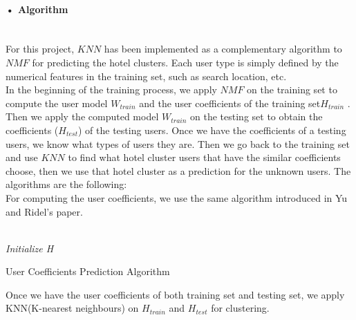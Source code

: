 \documentclass[11pt]{article} %
\begin{document}
\paragraph{• Algorithm}\mbox{}\\
For this project, $KNN$ has been implemented as a complementary algorithm to $NMF$ for predicting the hotel clusters. Each user type is simply defined by the numerical features in the training set, such as search location, etc.\\
In the beginning of the training process, we apply $NMF$ on the training set to compute the user model $W_{train}$ and the user coefficients of the training set$H_{train}$ . Then we apply the computed model $W_{train}$ on the testing set to obtain the coefficients ($H_{test}$) of the testing users. Once we have the coefficients of a testing users, we know what types of users they are. Then we go back to the training set and use $KNN$ to find what hotel cluster users that have the similar coefficients choose, then we use that hotel cluster as a prediction for the unknown users. The algorithms are the following:\\
For computing the user coefficients, we use the same algorithm \cite[p.6]{nmf1} introduced in Yu and Ridel's paper. \\\\
\begin{algorithm}[H]
\BlankLine
\emph{Initialize H}\;
\caption{User Coefficients Prediction Algorithm}\label{H}
\end{algorithm}\mbox{}
Once we have the user coefficients of both training set and testing set, we apply KNN(K-nearest neighbours) on $H_{train}$ and $H_{test}$ for clustering.\\
\end{document}
